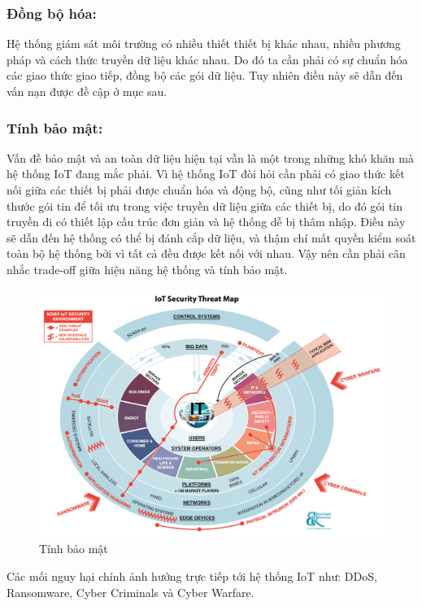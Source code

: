 \subsubsection*{Đồng bộ hóa:} Hệ thống giám sát môi trường có nhiều thiết thiết bị khác nhau, nhiều phương pháp và cách thức truyền dữ liệu khác nhau. Do đó ta cần phải có sự chuẩn hóa các giao thức giao tiếp, đồng bộ các gói dữ liệu. Tuy nhiên điều này sẽ dẫn đến vấn nạn được đề cập ở mục sau.

\subsubsection*{Tính bảo mật:} Vấn đề bảo mật và an toàn dữ liệu hiện tại vẫn là một trong những khó khăn mà hệ thống IoT đang mắc phải. Vì hệ thống IoT đòi hỏi cần phải có giao thức kết nối giữa các thiết bị phải được chuẩn hóa và động bộ, cũng như tối giản kích thước gói tin để tối ưu trong việc truyền dữ liệu giữa các thiết bị, do đó gói tin truyền đi có thiết lập cấu trúc đơn giản và hệ thống dễ bị thâm nhập. Điều này sẽ dẫn đến hệ thống có thể bị đánh cắp dữ liệu, và thậm chí mất quyền kiểm soát toàn bộ hệ thống bởi vì tất cả đều được kết nối với nhau. Vậy nên cần phải cân nhắc trade-off giữa hiệu năng hệ thống và tính bảo mật.
\begin{center}
\begin{figure}[htp]
\centering    
\includegraphics[width=5in]{virusiot}
\caption[Tính bảo mật]{Tính bảo mật}
\label{fig:virusiot}
\end{figure}
\end{center}
Các mối nguy hại chính ảnh hưởng trực tiếp tới hệ thống IoT như: DDoS, Ransomware, Cyber Criminals và Cyber Warfare. 











